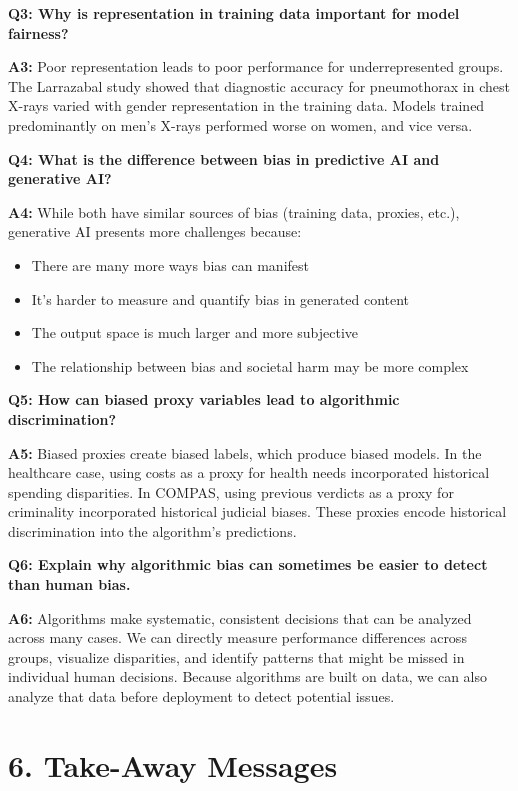 \vspace{0.3cm}
\textbf{Q3: Why is representation in training data important for model fairness?}

\textbf{A3:} Poor representation leads to poor performance for underrepresented groups. The Larrazabal study showed that diagnostic accuracy for pneumothorax in chest X-rays varied with gender representation in the training data. Models trained predominantly on men's X-rays performed worse on women, and vice versa.

\vspace{0.3cm}
\textbf{Q4: What is the difference between bias in predictive AI and generative AI?}

\textbf{A4:} While both have similar sources of bias (training data, proxies, etc.), generative AI presents more challenges because:
\begin{itemize}
    \item There are many more ways bias can manifest
    \item It's harder to measure and quantify bias in generated content
    \item The output space is much larger and more subjective
    \item The relationship between bias and societal harm may be more complex
\end{itemize}

\vspace{0.3cm}
\textbf{Q5: How can biased proxy variables lead to algorithmic discrimination?}

\textbf{A5:} Biased proxies create biased labels, which produce biased models. In the healthcare case, using costs as a proxy for health needs incorporated historical spending disparities. In COMPAS, using previous verdicts as a proxy for criminality incorporated historical judicial biases. These proxies encode historical discrimination into the algorithm's predictions.

\vspace{0.3cm}
\textbf{Q6: Explain why algorithmic bias can sometimes be easier to detect than human bias.}

\textbf{A6:} Algorithms make systematic, consistent decisions that can be analyzed across many cases. We can directly measure performance differences across groups, visualize disparities, and identify patterns that might be missed in individual human decisions. Because algorithms are built on data, we can also analyze that data before deployment to detect potential issues.
\section*{6. Take-Away Messages}

